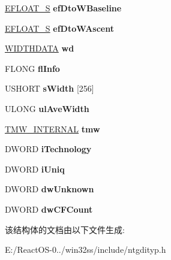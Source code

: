 \begin{DoxyCompactItemize}
\hyperlink{struct___e_f_l_o_a_t___s}{E\+F\+L\+O\+A\+T\+\_\+S} {\bfseries ef\+Dto\+W\+Baseline}
\item 
\mbox{\label{struct___c_f_o_n_t_a21bfb4938dfe68be2dcf20492414e388}} 
\hyperlink{struct___e_f_l_o_a_t___s}{E\+F\+L\+O\+A\+T\+\_\+S} {\bfseries ef\+Dto\+W\+Ascent}
\item 
\mbox{\label{struct___c_f_o_n_t_a4a15a01a81aabfa989a8fc5456114ca8}} 
\hyperlink{struct___w_i_d_t_h_d_a_t_a}{W\+I\+D\+T\+H\+D\+A\+TA} {\bfseries wd}
\item 
\mbox{\label{struct___c_f_o_n_t_a75f9a7d42a21a1dcdb09a0a764187685}} 
F\+L\+O\+NG {\bfseries fl\+Info}
\item 
\mbox{\label{struct___c_f_o_n_t_a8c74b2f6ff15a06b11fb9f73b096ec74}} 
U\+S\+H\+O\+RT {\bfseries s\+Width} \mbox{[}256\mbox{]}
\item 
\mbox{\label{struct___c_f_o_n_t_af2fa05c4798b61f487430f0636a4a11f}} 
U\+L\+O\+NG {\bfseries ul\+Ave\+Width}
\item 
\mbox{\label{struct___c_f_o_n_t_a70aa90c1cd78644b4ada7af98cc6f01d}} 
\hyperlink{struct___t_m_w___i_n_t_e_r_n_a_l}{T\+M\+W\+\_\+\+I\+N\+T\+E\+R\+N\+AL} {\bfseries tmw}
\item 
\mbox{\label{struct___c_f_o_n_t_a373f50242712cfea245ecec099cc2194}} 
D\+W\+O\+RD {\bfseries i\+Technology}
\item 
\mbox{\label{struct___c_f_o_n_t_a223d0ac8c1a9090c04493f35d3132177}} 
D\+W\+O\+RD {\bfseries i\+Uniq}
\item 
\mbox{\label{struct___c_f_o_n_t_a9dd6ad48587772f7bd1e9c4b3ffc3e2c}} 
D\+W\+O\+RD {\bfseries dw\+Unknown}
\item 
\mbox{\label{struct___c_f_o_n_t_a0ddf7d9d0834e1c54cd9faecb91001cd}} 
D\+W\+O\+RD {\bfseries dw\+C\+F\+Count}
\end{DoxyCompactItemize}


该结构体的文档由以下文件生成\+:\begin{DoxyCompactItemize}
\item 
E\+:/\+React\+O\+S-\/0../win32ss/include/ntgdityp.\+h\end{DoxyCompactItemize}
